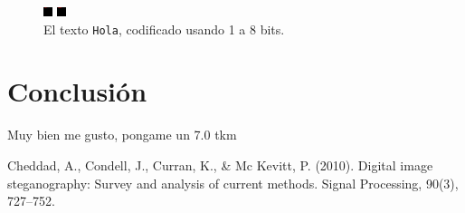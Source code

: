 \documentclass[conference]{IEEEtran}
\begin{document}
\begin{figure}[H]
\begin{multicols}{4}
    \includegraphics[width=0.9\linewidth]{image/black7.png} \par
    \includegraphics[width=0.9\linewidth]{image/black8.png} \par 
\end{multicols}
\caption{El texto \texttt{Hola}, codificado usando 1 a 8 bits.}
\end{figure}



    


\section*{Conclusión}
	Muy bien me gusto, pongame un 7.0 tkm


\begin{thebibliography}{99}
 Cheddad, A., Condell, J., Curran, K., \& Mc Kevitt, P. (2010). Digital image 
steganography: Survey and analysis of current methods. Signal Processing, 90(3), 727–752. 


\end{thebibliography}
\end{document}
